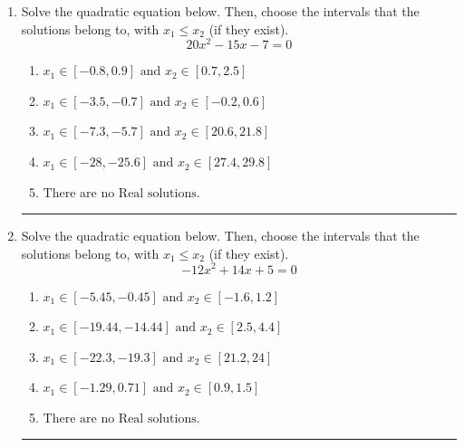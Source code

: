 \documentclass[14pt]{extbook}
\newcommand{\litem}[1]{\item#1\hspace*{-1cm}\rule{\textwidth}{0.4pt}}
\begin{document}
\begin{enumerate}
{\begin{enumerate}[label=\Alph*.]
\end{enumerate} }
\litem{
Solve the quadratic equation below. Then, choose the intervals that the solutions belong to, with $x_1 \leq x_2$ (if they exist).\[ 20x^{2} -15 x -7 = 0 \]\begin{enumerate}[label=\Alph*.]
\item \( x_1 \in [-0.8, 0.9] \text{ and } x_2 \in [0.7, 2.5] \)
\item \( x_1 \in [-3.5, -0.7] \text{ and } x_2 \in [-0.2, 0.6] \)
\item \( x_1 \in [-7.3, -5.7] \text{ and } x_2 \in [20.6, 21.8] \)
\item \( x_1 \in [-28, -25.6] \text{ and } x_2 \in [27.4, 29.8] \)
\item \( \text{There are no Real solutions.} \)

\end{enumerate} }
\litem{
Solve the quadratic equation below. Then, choose the intervals that the solutions belong to, with $x_1 \leq x_2$ (if they exist).\[ -12x^{2} +14 x + 5 = 0 \]\begin{enumerate}[label=\Alph*.]
\item \( x_1 \in [-5.45, -0.45] \text{ and } x_2 \in [-1.6, 1.2] \)
\item \( x_1 \in [-19.44, -14.44] \text{ and } x_2 \in [2.5, 4.4] \)
\item \( x_1 \in [-22.3, -19.3] \text{ and } x_2 \in [21.2, 24] \)
\item \( x_1 \in [-1.29, 0.71] \text{ and } x_2 \in [0.9, 1.5] \)
\item \( \text{There are no Real solutions.} \)


\end{enumerate}}
\end{enumerate}
\end{document}
